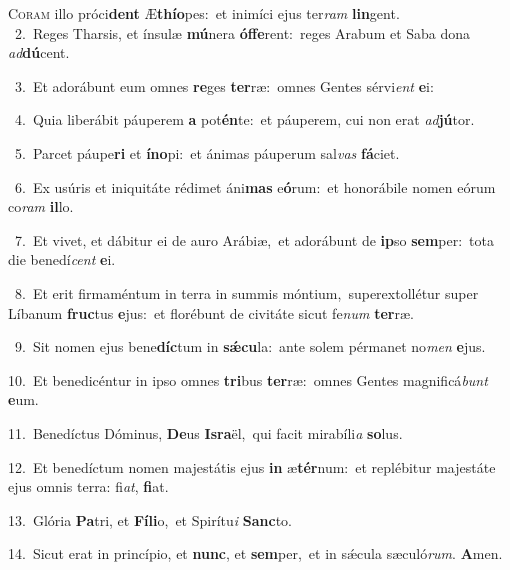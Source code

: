 \lettrine{\initial\textcolor{\initialcolor}{C}}{oram} illo próci\textbf{dent} Æ\-\textbf{thí}\-\textbf{o}pes:~\star et inimíci ejus ter\textit{ram} \textbf{lin}\-gent.\\
{\numbfont\textcolor{\numbcolor}{~2.}}~Reges Tharsis, et ínsulæ \textbf{mú}\-nera \textbf{óf}\-\textbf{fe}rent:~\star reges Arabum et Saba dona \textit{ad}\-\textbf{dú}cent.\par
{\numbfont\textcolor{\numbcolor}{~3.}}~Et adorábunt eum omnes \textbf{re}\-ges \textbf{ter}\-ræ:~\star omnes Gentes sérvi\textit{ent} \textbf{e}\-i:\par
{\numbfont\textcolor{\numbcolor}{~4.}}~Quia liberábit páuperem \textbf{a} pot\-\textbf{én}\-te:~\star et páuperem, cui non erat \textit{ad}\-\textbf{jú}tor.\par
{\numbfont\textcolor{\numbcolor}{~5.}}~Parcet páupe\textbf{ri} et \textbf{ín}\-\textbf{o}pi:~\star et ánimas páuperum sal\textit{vas} \textbf{fá}\-ciet.\par
{\numbfont\textcolor{\numbcolor}{~6.}}~Ex usúris et iniquitáte rédimet áni\textbf{mas} e\-\textbf{ó}\-rum:~\star et honorábile nomen eórum co\textit{ram} \textbf{il}\-lo.\par
{\numbfont\textcolor{\numbcolor}{~7.}}~Et vivet, et dábitur ei de auro Arábiæ,~\dagger et adorábunt de \textbf{ip}\-so \textbf{sem}\-per:~\star tota die benedí\textit{cent} \textbf{e}\-i.\par
{\numbfont\textcolor{\numbcolor}{~8.}}~Et erit firmaméntum in terra in summis móntium,~\dagger superextollétur super Líbanum \textbf{fruc}\-tus \textbf{e}\-jus:~\star et florébunt de civitáte sicut fe\textit{num} \textbf{ter}\-ræ.\par
{\numbfont\textcolor{\numbcolor}{~9.}}~Sit nomen ejus bene\-\textbf{díc}\-tum in \textbf{sǽ}\-\textbf{cu}la:~\star ante solem pérmanet no\textit{men} \textbf{e}\-jus.\par
{\numbfont\textcolor{\numbcolor}{10.}}~Et benedicéntur in ipso omnes \textbf{tri}\-bus \textbf{ter}\-ræ:~\star omnes Gentes magnificá\textit{bunt} \textbf{e}\-um.\par
{\numbfont\textcolor{\numbcolor}{11.}}~Benedíctus Dóminus, \textbf{De}\-us \textbf{Is}\-\textbf{ra}ël,~\star qui facit mirabíli\textit{a} \textbf{so}\-lus.\par
{\numbfont\textcolor{\numbcolor}{12.}}~Et benedíctum nomen majestátis ejus \textbf{in} æ\-\textbf{tér}\-num:~\star et replébitur majestáte ejus omnis terra: fi\-\textit{at}\-, \textbf{fi}\-at.\par
{\numbfont\textcolor{\numbcolor}{13.}}~Glória \textbf{Pa}\-tri, et \textbf{Fí}\-\textbf{li}o,~\star et Spirítu\textit{i} \textbf{Sanc}\-to.\par
{\numbfont\textcolor{\numbcolor}{14.}}~Sicut erat in princípio, et \textbf{nunc}\-, et \textbf{sem}\-per,~\star et in sǽcula sæculó\-\textit{rum}\-. \textbf{A}\-men.\par

